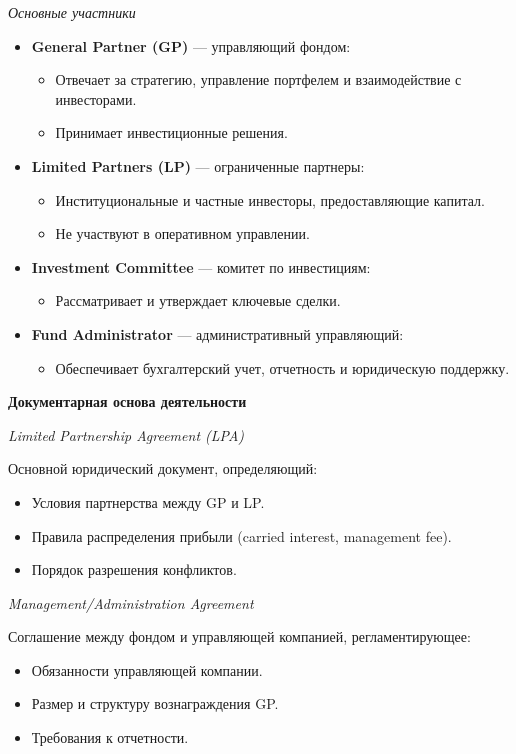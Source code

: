 \textit{Основные участники}
\begin{itemize}
    \item \textbf{General Partner (GP)} --- управляющий фондом:
    \begin{itemize}
        \item Отвечает за стратегию, управление портфелем и взаимодействие с инвесторами.
        \item Принимает инвестиционные решения.
    \end{itemize}
    \item \textbf{Limited Partners (LP)} --- ограниченные партнеры:
    \begin{itemize}
        \item Институциональные и частные инвесторы, предоставляющие капитал.
        \item Не участвуют в оперативном управлении.
    \end{itemize}
    \item \textbf{Investment Committee} --- комитет по инвестициям:
    \begin{itemize}
        \item Рассматривает и утверждает ключевые сделки.
    \end{itemize}
    \item \textbf{Fund Administrator} --- административный управляющий:
    \begin{itemize}
        \item Обеспечивает бухгалтерский учет, отчетность и юридическую поддержку.
    \end{itemize}
\end{itemize}

\textbf{Документарная основа деятельности}

\textit{Limited Partnership Agreement (LPA)}

Основной юридический документ, определяющий:
\begin{itemize}
    \item Условия партнерства между GP и LP.
    \item Правила распределения прибыли (carried interest, management fee).
    \item Порядок разрешения конфликтов.
\end{itemize}

\textit{Management/Administration Agreement}

Соглашение между фондом и управляющей компанией, регламентирующее:
\begin{itemize}
    \item Обязанности управляющей компании.
    \item Размер и структуру вознаграждения GP.
    \item Требования к отчетности.
\end{itemize}

